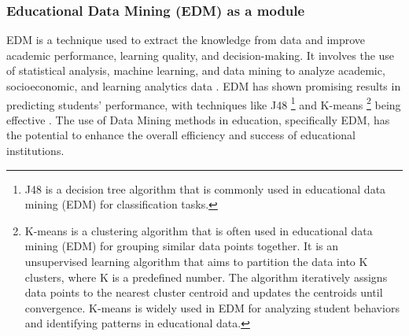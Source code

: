 \subsubsection{Educational Data Mining (EDM) as a module}
EDM is a technique used to extract the knowledge from data and improve academic performance, learning quality, and decision-making. 
It involves the use of statistical analysis, machine learning, and data mining to analyze academic, socioeconomic, 
and learning analytics data \citep{hooda_integrating_2022, arifin_using_2022}. EDM has shown promising results in predicting students' 
performance, with techniques like J48 \footnote{J48 is a decision tree algorithm that is commonly used in 
educational data mining (EDM) for classification tasks.} and K-means \footnote{ K-means is a clustering algorithm that is often used in educational data mining 
(EDM) for grouping similar data points together.  
It is an unsupervised learning algorithm that aims to partition the data into K clusters, where K is a predefined number. 
The algorithm iteratively assigns data points to the nearest cluster centroid and updates the centroids until convergence. 
K-means is widely used in EDM for analyzing student behaviors and identifying patterns in educational data.} being effective \citep{prince_sattam_bin_abdulaziz_university_state_2016}. 
The use of Data Mining methods in education, specifically EDM, has the potential to enhance the overall efficiency and success of educational institutions.
